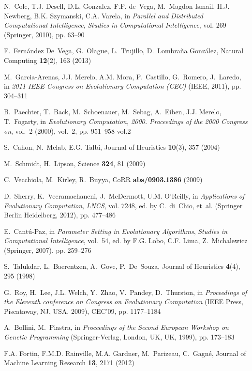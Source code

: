\begin{thebibliography}{10}
N.~Cole, T.J. Desell, D.L. Gonzalez, F.F. de~Vega, M.~Magdon-Ismail, H.J.
  Newberg, B.K. Szymanski, C.A. Varela, in \emph{Parallel and Distributed
  Computational Intelligence}, \emph{Studies in Computational Intelligence},
  vol. 269 (Springer, 2010), pp. 63--90

F.~Fern\'{a}ndez De~Vega, G.~Olague, L.~Trujillo, D.~Lombra\~{n}a Gonz\'{a}lez,
  Natural Computing \textbf{12}(2), 163 (2013)

M.~Garcia-Arenas, J.J. Merelo, A.M. Mora, P.~Castillo, G.~Romero, J.~Laredo, in
  \emph{2011 IEEE Congress on Evolutionary Computation (CEC)} (IEEE, 2011), pp.
  304--311

B.~Paechter, T.~Back, M.~Schoenauer, M.~Sebag, A.~Eiben, J.J. Merelo,
  T.~Fogarty, in \emph{Evolutionary Computation, 2000. Proceedings of the 2000
  Congress on}, vol.~2 (2000), vol.~2, pp. 951--958 vol.2

S.~Cahon, N.~Melab, E.G. Talbi, Journal of Heuristics \textbf{10}(3), 357
  (2004)

M.~Schmidt, H.~Lipson, Science \textbf{324}, 81 (2009)

C.~Vecchiola, M.~Kirley, R.~Buyya, CoRR \textbf{abs/0903.1386} (2009)

D.~Sherry, K.~Veeramachaneni, J.~McDermott, U.M. O'Reilly, in
  \emph{Applications of Evolutionary Computation}, \emph{LNCS}, vol. 7248, ed.
  by C.~di~Chio, et~al. (Springer Berlin Heidelberg, 2012), pp. 477--486

E.~Cant\'u-Paz, in \emph{Parameter Setting in Evolutionary Algorithms},
  \emph{Studies in Computational Intelligence}, vol.~54, ed. by F.G. Lobo, C.F.
  Lima, Z.~Michalewicz (Springer, 2007), pp. 259--276

S.~Talukdar, L.~Baerentzen, A.~Gove, P.~De~Souza, Journal of Heuristics
  \textbf{4}(4), 295 (1998)

G.~Roy, H.~Lee, J.L. Welch, Y.~Zhao, V.~Pandey, D.~Thurston, in
  \emph{Proceedings of the Eleventh conference on Congress on Evolutionary
  Computation} (IEEE Press, Piscataway, NJ, USA, 2009), CEC'09, pp. 1177--1184

A.~Bollini, M.~Piastra, in \emph{Proceedings of the Second European Workshop on
  Genetic Programming} (Springer-Verlag, London, UK, UK, 1999), pp. 173--183

F.A. Fortin, F.M.D. Rainville, M.A. Gardner, M.~Parizeau, C.~Gagn\'e, Journal
  of Machine Learning Research \textbf{13}, 2171 (2012)


\end{thebibliography}
